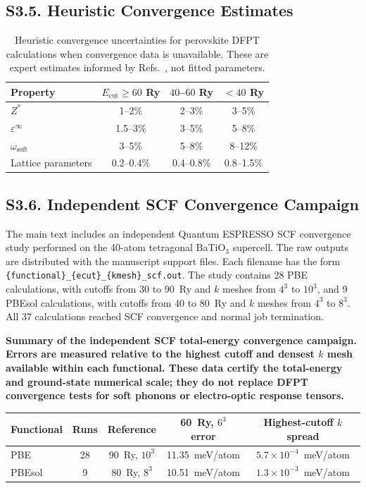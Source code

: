\documentclass[onecolumn,superscriptaddress,amsmath,amssymb,longbibliography]{revtex4-2}
\begin{document}
\subsection{S3.5. Heuristic Convergence Estimates}

\begin{table}[h]
\centering
\caption{Heuristic convergence uncertainties for perovskite DFPT
calculations when convergence data is unavailable. These are expert
estimates informed by Refs.~\cite{Ghosez1999,Wahl2008}, not fitted
parameters.}
\label{tab:si_heuristic}
\begin{tabular}{lccc}
\toprule
Property & $E_{\mathrm{cut}} \geq 60$ Ry & $40$--$60$ Ry & $< 40$ Ry \\
\midrule
$Z^*$ & 1--2\% & 2--3\% & 3--5\% \\
$\varepsilon^\infty$ & 1.5--3\% & 3--5\% & 5--8\% \\
$\omega_{\mathrm{soft}}$ & 3--5\% & 5--8\% & 8--12\% \\
Lattice parameters & 0.2--0.4\% & 0.4--0.8\% & 0.8--1.5\% \\
\bottomrule
\end{tabular}
\end{table}

\subsection{S3.6. Independent SCF Convergence Campaign}

The main text includes an independent Quantum ESPRESSO SCF convergence study
performed on the 40-atom tetragonal BaTiO$_3$ supercell. The raw outputs are
distributed with the manuscript support files. Each filename has the form
\texttt{\{functional\}\_\{ecut\}\_\{kmesh\}\_scf.out}. The study contains
28 PBE calculations, with cutoffs from 30 to 90~Ry and $k$ meshes from
$4^3$ to $10^3$, and 9 PBEsol calculations, with cutoffs from 40 to 80~Ry
and $k$ meshes from $4^3$ to $8^3$. All 37 calculations reached SCF
convergence and normal job termination.

\begin{center}
\textbf{Summary of the independent SCF total-energy convergence campaign.
Errors are measured relative to the highest cutoff and densest $k$ mesh
available within each functional. These data certify the total-energy and
ground-state numerical scale; they do not replace DFPT convergence tests for
soft phonons or electro-optic response tensors.}\\[0.5em]
\begin{tabular}{lcccc}
\toprule
Functional & Runs & Reference & 60~Ry, $6^3$ error & Highest-cutoff $k$ spread \\
\midrule
PBE & 28 & 90~Ry, $10^3$ & 11.35~meV/atom & $5.7\times10^{-4}$~meV/atom \\
PBEsol & 9 & 80~Ry, $8^3$ & 10.51~meV/atom & $1.3\times10^{-3}$~meV/atom \\
\bottomrule
\end{tabular}
\end{center}
\end{document}
